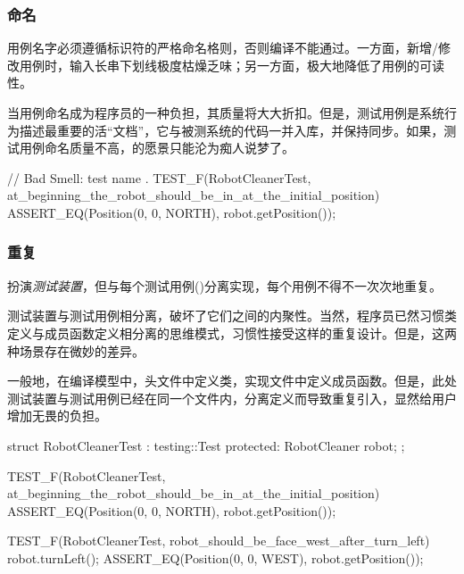 \begin{content}
\subsubsection{命名}

用例名字必须遵循标识符的严格命名格则，否则编译不能通过。一方面，新增/修改用例时，输入长串下划线极度枯燥乏味；另一方面，极大地降低了用例的可读性。

当用例命名成为程序员的一种负担，其质量将大大折扣。但是，测试用例是系统行为描述最重要的活“文档”，它与被测系统的代码一并入库，并保持同步。如果，测试用例命名质量不高，的愿景只能沦为痴人说梦了。

\begin{leftbar}
 \begin{c++}[caption={\ttfamily{坏味道：使用标识符命名用例}}]
// Bad Smell: test name .
TEST_F(RobotCleanerTest, at_beginning_the_robot_should_be_in_at_the_initial_position) {
  ASSERT_EQ(Position(0, 0, NORTH), robot.getPosition());
}
 \end{c++}
\end{leftbar}

\subsubsection{重复}

扮演\emph{测试装置}，但与每个测试用例()分离实现，每个用例不得不一次次地重复。

测试装置与测试用例相分离，破坏了它们之间的内聚性。当然，程序员已然习惯类定义与成员函数定义相分离的思维模式，习惯性接受这样的重复设计。但是，这两种场景存在微妙的差异。

一般地，在\cpp{}编译模型中，头文件中定义类，实现文件中定义成员函数。但是，此处测试装置与测试用例已经在同一个文件内，分离定义而导致重复引入，显然给用户增加无畏的负担。

\begin{leftbar}
 \begin{c++}[caption={\ttfamily{缺乏内聚：测试装置与测试用例相分离，重复设计}}]
struct RobotCleanerTest : testing::Test {
protected:
  RobotCleaner robot;
};
 
TEST_F(RobotCleanerTest, at_beginning_the_robot_should_be_in_at_the_initial_position) {
  ASSERT_EQ(Position(0, 0, NORTH), robot.getPosition());
}
 
TEST_F(RobotCleanerTest, robot_should_be_face_west_after_turn_left) {
  robot.turnLeft();
  ASSERT_EQ(Position(0, 0, WEST), robot.getPosition());
}
  \end{c++}
\end{leftbar}


\end{content}
